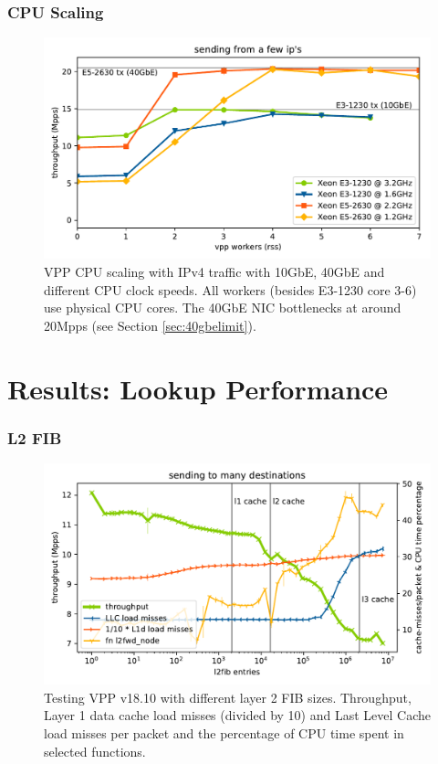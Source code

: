 \begin{frame}
    \frametitle{CPU Scaling}
    \begin{figure}[!ht]
    \noindent\hspace{0.5mm}\includegraphics[width=\linewidth]{pics/throughput_summary_multicore.pdf}
    \caption{VPP CPU scaling with IPv4 traffic with 10GbE, 40GbE and different CPU clock speeds. All workers (besides E3-1230 core 3-6) use physical CPU cores. The 40GbE NIC bottlenecks at around 20Mpps (see Section \ref{sec:40gbelimit}). }
    \label{graph:multicore}
    \end{figure}
\end{frame}

\section{Results: Lookup Performance}

\begin{frame}
    \frametitle{L2 FIB}
    \begin{figure}[!ht]
    \noindent\hspace{0.5mm}\includegraphics[width=\linewidth]{pics/throughput_l2_throughmac_klaipeda32ghz_v3.pdf}
    \caption{Testing VPP v18.10 with different layer 2 FIB sizes. Throughput, Layer 1 data cache load misses (divided by 10) and Last Level Cache load misses per packet and the percentage of CPU time spent in selected functions. }
    \label{graph:l2fib}
    \end{figure}
\end{frame}

